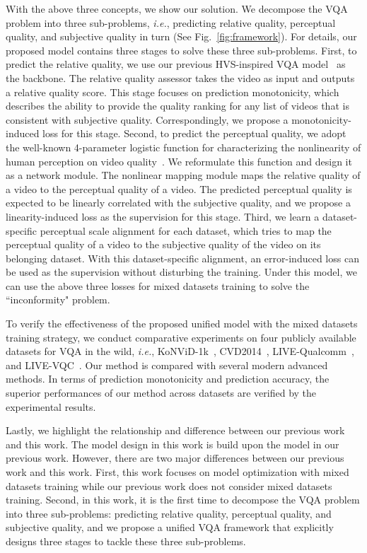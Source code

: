 \documentclass[twocolumn]{svjour3}          \smartqed  \usepackage{graphicx}
\begin{document}
With the above three concepts, we show our solution.
We decompose the VQA problem into three sub-problems, \textit{i.e.}, predicting relative quality, perceptual quality, and subjective quality in turn (See Fig.~\ref{fig:framework}).
For details, our proposed model contains three stages to solve these three sub-problems. 
First, to predict the relative quality, we use our previous HVS-inspired VQA model~\citep{li2019quality} as the backbone.
The relative quality assessor takes the video as input and outputs a relative quality score.
This stage focuses on prediction monotonicity, which describes the ability to provide the quality ranking for any list of videos that is consistent with subjective quality. 
Correspondingly, we propose a monotonicity-induced loss for this stage.
Second, to predict the perceptual quality, we adopt the well-known 4-parameter logistic function for characterizing the nonlinearity of human perception on video quality~\citep{vqeg2000fr}.
We reformulate this function and design it as a network module.
The nonlinear mapping module maps the relative quality of a video to the perceptual quality of a video.
The predicted perceptual quality is expected to be linearly correlated with the subjective quality, and we propose a linearity-induced loss as the supervision for this stage.
Third, we learn a dataset-specific perceptual scale alignment for each dataset, which tries to map the perceptual quality of a video to the subjective quality of the video on its belonging dataset.
With this dataset-specific alignment, an error-induced loss can be used as the supervision without disturbing the training. 
Under this model, we can use the above three losses for mixed datasets training to solve the ``inconformity" problem.

To verify the effectiveness of the proposed unified model with the mixed datasets training strategy, we conduct comparative experiments on four publicly available datasets for VQA in the wild, \textit{i.e.},  KoNViD-1k~\citep{hosu2017konstanz}, CVD2014~\citep{nuutinen2016cvd2014}, LIVE-Qualcomm~\citep{ghadiyaram2018capture}, and LIVE-VQC~\citep{sinno2019large}. 
Our method is compared with several modern advanced methods.
In terms of prediction monotonicity and prediction accuracy, the superior performances of our method across datasets are verified by the experimental results. 

Lastly, we highlight the relationship and difference between our previous work~\citep{li2019quality} and this work.
The model design in this work is build upon the model in our previous work.
However, there are two major differences between our previous work and this work.
First, this work focuses on model optimization with mixed datasets training while our previous work does not consider mixed datasets training.
Second, in this work, it is the first time to decompose the VQA problem into three sub-problems: predicting relative quality, perceptual quality, and subjective quality, and we propose a unified VQA framework that explicitly designs three stages to tackle these three sub-problems. 
\end{document}
